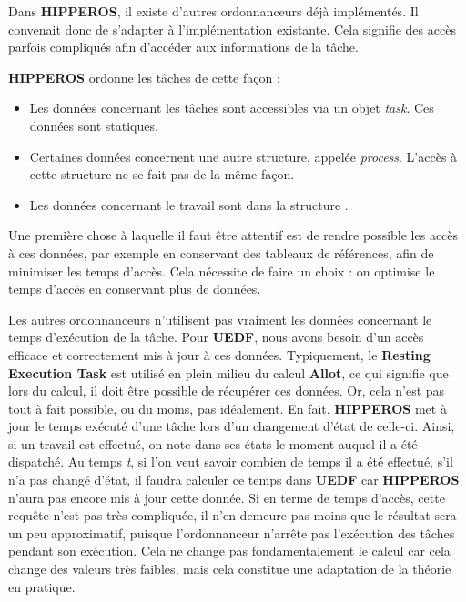 		Dans \textbf{HIPPEROS}, il existe d'autres ordonnanceurs déjà implémentés. Il convenait donc 
		de s'adapter à l'implémentation existante. Cela signifie des accès parfois compliqués afin d'accéder 
		aux informations de la tâche.\newline
		
		\textbf{HIPPEROS} ordonne les tâches de cette façon : 
		\begin{itemize}
			\item Les données concernant les tâches sont accessibles via un objet \textit{task}. Ces 
			données sont statiques.
			\item Certaines données concernent une autre structure, appelée \textit{process}. L'accès 
			à cette structure ne se fait pas de la même façon. 
			\item Les données concernant le travail sont dans la structure .
		\end{itemize}
		Une première chose à laquelle il faut être attentif est de rendre possible les accès 
		à ces données, par exemple en conservant des tableaux de références, afin de minimiser les temps 
		d'accès. Cela nécessite de faire un choix : on optimise le temps d'accès en conservant plus de données. \newline
	
		Les autres ordonnanceurs n'utilisent pas vraiment les données concernant le temps 
		d'exécution de la tâche. Pour \textbf{UEDF}, nous avons besoin d'un accès efficace et 
		correctement mis à jour à ces données. Typiquement, le \textbf{Resting Execution Task} est utilisé en plein 
		milieu du calcul \textbf{Allot}, ce qui signifie que lors du calcul, il doit être possible 
		de récupérer ces données. Or, cela n'est pas tout à fait possible, ou du moins, pas idéalement. 
		En fait, \textbf{HIPPEROS} met à jour le temps exécuté d'une tâche lors d'un changement d'état de celle-ci. 
		Ainsi, si un travail est effectué, on note dans ses états le moment auquel il a été dispatché.
		Au temps \textit{t}, si l'on veut savoir combien de temps il a été effectué, s'il n'a pas changé 
		d'état, il faudra calculer ce temps dans \textbf{UEDF} car \textbf{HIPPEROS} n'aura pas encore mis à 
		jour cette donnée.\newline
		Si en terme de temps d'accès, cette requête n'est pas très compliquée, il n'en demeure pas moins 
		que le résultat sera un peu approximatif, puisque l'ordonnanceur n'arrête pas l'exécution des tâches pendant 
		son exécution. Cela ne change pas fondamentalement le calcul car cela change des valeurs très faibles, 
		mais cela constitue une adaptation de la théorie en pratique.\newline
		
